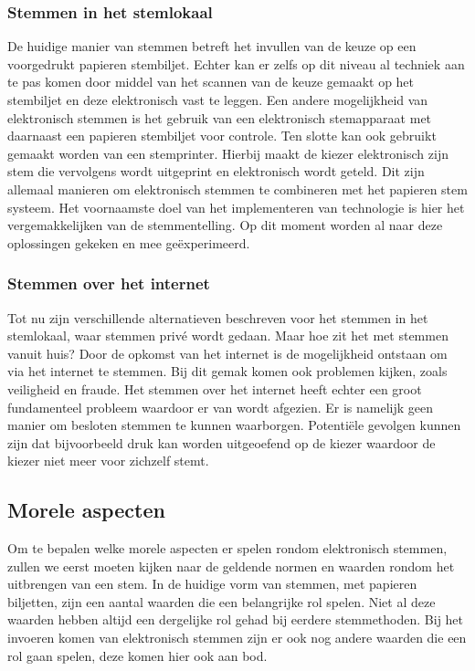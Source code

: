 \documentclass[a4paper]{article}
\begin{document}
\subsubsection{Stemmen in het stemlokaal}
De huidige manier van stemmen betreft het invullen van de keuze op een voorgedrukt papieren stembiljet. 
Echter kan er zelfs op dit niveau al techniek aan te pas komen door middel van het scannen van de keuze gemaakt op het stembiljet en deze elektronisch vast te leggen.
Een andere mogelijkheid van elektronisch stemmen is het gebruik van een elektronisch stemapparaat met daarnaast een papieren stembiljet voor controle.
Ten slotte kan ook gebruikt gemaakt worden van een stemprinter. 
Hierbij maakt de kiezer elektronisch zijn stem die vervolgens wordt uitgeprint en elektronisch wordt geteld.
Dit zijn allemaal manieren om elektronisch stemmen te combineren met het papieren stem systeem.
Het voornaamste doel van het implementeren van technologie is hier het vergemakkelijken van de stemmentelling.
Op dit moment worden al naar deze oplossingen gekeken en mee ge{\"e}xperimeerd.

\subsubsection{Stemmen over het internet}
Tot nu zijn verschillende alternatieven beschreven voor het stemmen in het stemlokaal, waar stemmen priv{\'e} wordt gedaan. 
Maar hoe zit het met stemmen vanuit huis?
Door de opkomst van het internet is de mogelijkheid ontstaan om via het internet te stemmen.
Bij dit gemak komen ook problemen kijken, zoals veiligheid en fraude. 
Het stemmen over het internet heeft echter een groot fundamenteel probleem waardoor er van wordt afgezien.
Er is namelijk geen manier om besloten stemmen te kunnen waarborgen.
Potenti{\"e}le gevolgen kunnen zijn dat bijvoorbeeld druk kan worden uitgeoefend op de kiezer waardoor de kiezer niet meer voor zichzelf stemt.

\subsection{Morele aspecten}
Om te bepalen welke morele aspecten er spelen rondom elektronisch stemmen, zullen we eerst moeten kijken naar de geldende normen en waarden rondom het uitbrengen van een stem.
In de huidige vorm van stemmen, met papieren biljetten, zijn een aantal waarden die een belangrijke rol spelen.
Niet al deze waarden hebben altijd een dergelijke rol gehad bij eerdere stemmethoden.
Bij het invoeren komen van elektronisch stemmen zijn er ook nog andere waarden die een rol gaan spelen, deze komen hier ook aan bod.
\end{document}
